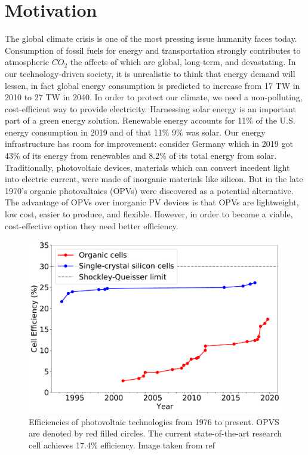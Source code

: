 \section*{Motivation}

The global climate crisis is one of the most pressing issue humanity faces today.
Consumption of fossil fuels for energy and transportation strongly contributes to atmospheric $CO_2$ the affects of which are global, long-term, and devastating\cite{Solomon2009a}.
In our technology-driven society, it is unrealistic to think that energy demand will lessen, in fact global energy consumption is predicted to increase from 17 TW in 2010 to 27 TW in 2040\cite{Mazzio2015}.
In order to protect our climate, we need a non-polluting, cost-efficient way to provide electricity.
Harnessing solar energy is an important part of a green energy solution.
Renewable energy accounts for 11\% of the U.S. energy consumption in 2019 and of that 11\% 9\% was solar\cite{USEIA2020}.
Our energy infrastructure has room for improvement: consider Germany which in 2019 got 43\% of its energy from renewables and 8.2\% of its total energy from solar\cite{Wirth2017}.
Traditionally, photovoltaic devices, materials which can convert incedent light into electric current, were made of inorganic materials like silicon.
But in the late 1970's organic photovaltaics (OPVs) were discovered as a potential alternative\cite{Tang1986b}.
The advantage of OPVs over inorganic PV devices is that OPVs are lightweight, low cost, easier to produce, and flexible. 
However, in order to become a viable, cost-effective option they need better efficiency\cite{Mazzio2015}.

\begin{figure}[h!]
    \includegraphics[width=0.9\linewidth]{images/NREL2020.pdf}
    \caption{Efficiencies of photovoltaic technologies from 1976 to present. OPVS are denoted by red filled circles. The current state-of-the-art research cell achieves 17.4\% efficiency. Image taken from ref \cite{NREL2020}}
    \label{fig:nrel}
\end{figure}

